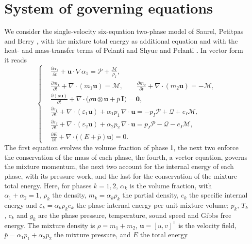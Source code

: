 \section{System of governing equations}
\label{sec:governing}
We consider the single-velocity six-equation two-phase model of Saurel, Petitpas and Berry \cite{SPB2009}, with the
mixture total energy as additional equation and with the heat- and mass-transfer terms of Pelanti and Shyue
\cite{PelantiShyue2014} and Pelanti \cite{Pelanti2022}. In vector form it reads
\begin{equation}
\left\{
\begin{aligned}
&\frac{\partial\alpha_1}{\partial t}+\mathbf u\cdot\nabla\alpha_1=\mathcal P+\frac{\mathcal M}{\rho_I},\\
&\frac{\partial m_1}{\partial t}+\nabla\cdot(m_1\mathbf u)=\mathcal M,\qquad \frac{\partial m_2}{\partial t}+\nabla\cdot(m_2\mathbf u)=-\mathcal M,\\
&\frac{\partial(\rho\mathbf u)}{\partial t}+\nabla\cdot\big(\rho\mathbf u\otimes\mathbf u+\bar p\,\mathbf I\big)=\mathbf 0,\\
&\frac{\partial\varepsilon_1}{\partial t}+\nabla\cdot(\varepsilon_1\mathbf u)+\alpha_1p_1\,\nabla\cdot\mathbf u=-p_I\mathcal P+\mathcal Q+e_I\mathcal M,\\
&\frac{\partial\varepsilon_2}{\partial t}+\nabla\cdot(\varepsilon_2\mathbf u)+\alpha_2p_2\,\nabla\cdot\mathbf u=p_I\mathcal P-\mathcal Q-e_I\mathcal M,\\
&\frac{\partial E}{\partial t}+\nabla\cdot\big((E+\bar p)\mathbf u\big)=0 .
\end{aligned}\right.
\label{eq:model}
\end{equation}
The first equation evolves the volume fraction of phase 1, the next two enforce the conservation of the mass of each
phase, the fourth, a vector equation, governs the mixture momentum, the next two account for the
internal energy of each phase, with its pressure work, and the last for the conservation of the mixture total energy.
Here, for phases $k=1,2$, $\alpha_k$ is the volume fraction, with $\alpha_1+\alpha_2=1$, $\rho_k$ the density, $m_k=\alpha_k\rho_k$ the partial
density, $e_k$ the specific internal energy and $\varepsilon_k=\alpha_k\rho_ke_k$ the phase internal energy per unit mixture volume;
$p_k$, $T_k$, $c_k$ and $g_k$ are the phase pressure, temperature, sound speed and Gibbs free energy. The mixture density is
$\rho=m_1+m_2$, $\mathbf u=[u,v]^{\mathsf T}$ is the velocity field, $\bar p=\alpha_1p_1+\alpha_2p_2$ the mixture pressure, and $E$ the total energy
